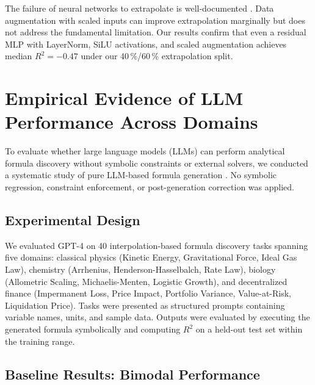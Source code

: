 \documentclass[twoside,11pt]{article}
\newcommand{\Rsq}{R^{2}}
\begin{document}
The failure of neural networks to extrapolate is well-documented \citep{xu2021neural}.
Data augmentation with scaled inputs \citep{lim2021temporal} can improve extrapolation
marginally but does not address the fundamental limitation.  Our results confirm
that even a residual MLP with LayerNorm, SiLU activations, and scaled augmentation
achieves median $\Rsq=-0.47$ under our 40\,\%/60\,\% extrapolation split.

\section{Empirical Evidence of LLM Performance Across Domains}
\label{sec:llm_limitations}

To evaluate whether large language models (LLMs) can perform analytical formula discovery without symbolic constraints or external solvers, we conducted a systematic study of pure LLM-based formula generation \citep{koza1992genetic,kambhampati2024llms}. No symbolic regression, constraint enforcement, or post-generation correction was applied.

\subsection{Experimental Design}\label{subsec:experimental-design}
\label{sec:llm_exp_design}

We evaluated GPT-4 \citep{openai2023gpt4} on 40 interpolation-based formula discovery tasks spanning five domains: classical physics (Kinetic Energy, Gravitational Force, Ideal Gas Law), chemistry (Arrhenius, Henderson-Hasselbalch, Rate Law), biology (Allometric Scaling, Michaelis-Menten, Logistic Growth), and decentralized finance (Impermanent Loss, Price Impact, Portfolio Variance, Value-at-Risk, Liquidation Price). Tasks were presented as structured prompts containing variable names, units, and sample data. Outputs were evaluated by executing the generated formula symbolically and computing $\Rsq$ on a held-out test set within the training range.

\subsection{Baseline Results: Bimodal Performance}\label{subsec:baseline-results-bimodal-performance}
\label{sec:llm_baseline}
\end{document}
